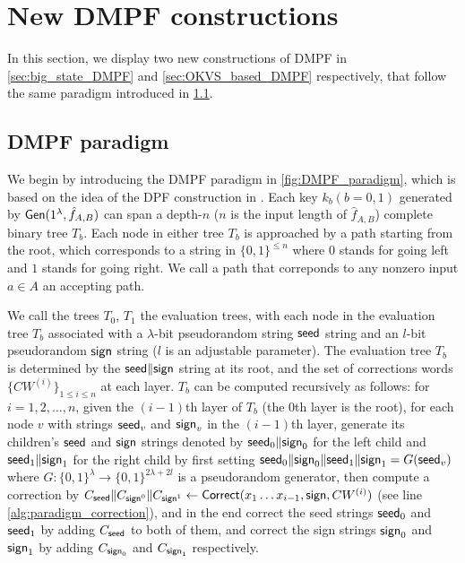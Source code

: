 \section{New DMPF constructions}
In this section, we display two new constructions of DMPF in \cref{sec:big_state_DMPF} and \cref{sec:OKVS_based_DMPF} respectively,  that follow the same paradigm introduced in \cref{sec:DMPF_paradigm}. 

\subsection{DMPF paradigm}\label{sec:DMPF_paradigm}
We begin by introducing the DMPF paradigm in \cref{fig:DMPF_paradigm}, which is based on the idea of the DPF construction in \cite{CCS:BoyGilIsh16}. Each key $k_b(b=0,1)$ generated by ${\sf Gen}(1^\lambda,\hat{f}_{A,B})$ can span a depth-$n$ ($n$ is the input length of $\hat{f}_{A,B}$) complete binary tree $T_b$. Each node in either tree $T_b$ is approached by a path starting from the root, which corresponds to a string in $\{0,1\}^{\le n}$ where $0$ stands for going left and $1$ stands for going right. We call a path that correponds to any nonzero input $a\in A$ an accepting path. 



We call the trees $T_0$, $T_1$ the evaluation trees, with each node in the evaluation tree $T_b$ associated with a $\lambda$-bit pseudorandom string ${\sf seed}$ string and an $l$-bit pseudorandom ${\sf sign}$ string ($l$ is an adjustable parameter). 
The evaluation tree $T_b$ is determined by the ${\sf seed}\|{\sf sign}$ string at its root, and the set of corrections words $\{CW^{(i)}\}_{1\le i\le n}$ at each layer. $T_b$ can be computed recursively as follows: for $i = 1,2,\dots, n$, given the $(i-1)$th layer of $T_b$ (the 0th layer is the root), for each node $v$ with strings ${\sf seed}_v$ and ${\sf sign}_v$ in the $(i-1)$th layer, generate its children's ${\sf seed}$ and ${\sf sign}$ strings denoted by ${\sf seed}_0\|{\sf sign}_0$ for the left child and ${\sf seed}_1\|{\sf sign}_1$ for the right child by first setting ${\sf seed}_0\|{\sf sign}_0\|{\sf seed}_1\|{\sf sign}_1 = G({\sf seed}_v)$ where $G:\{0,1\}^\lambda\rightarrow \{0,1\}^{2\lambda+2l}$ is a pseudorandom generator, then compute a correction by $C_{\sf seed}\|C_{{\sf sign}^0}\|C_{{\sf sign}^1}\gets{\sf Correct}(x_1\dots x_{i-1}, {\sf sign}, CW^{(i)})$ (see line \ref{alg:paradigm_correction}), and in the end correct the seed strings ${\sf seed}_0$ and ${\sf seed}_1$ by adding $C_{\sf seed}$ to both of them, and correct the sign strings ${\sf sign}_0$ and ${\sf sign}_1$ by adding $C_{{\sf sign}_0}$ and $C_{{\sf sign}_1}$ respectively. 


